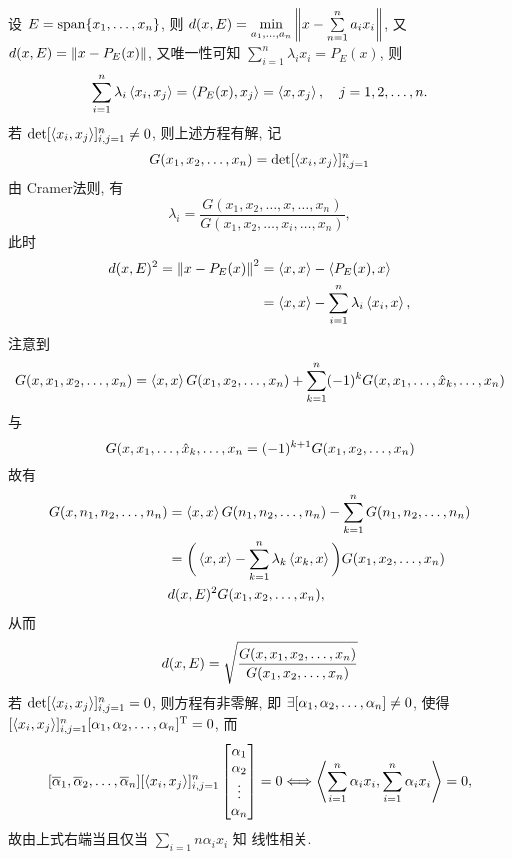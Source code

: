 设 $ E=\operatorname{span}\{ x_{1}, \dots, x_{n} \} $, 则 $ d(x, E)=\min\limits_{a_{1}, \dots, a_{n} }\left\| x-\sum\limits_{n=1}^{n}a_{i}x_{i} \right\| $, 又 $ d(x, E)=\left\| x-P_{E}(x) \right\| $, 又唯一性可知 $ \sum\limits_{i=1}^{n}\lambda_{i}x_{i}=P_{E}(x) $, 则
\[
	\sum_{i=1}^{n}\lambda_{i}\left\langle x_{i}, x_{j} \right\rangle=\left\langle P_{E}(x), x_{j} \right\rangle=\left\langle x, x_{j} \right\rangle, \quad j = 1, 2, \dots, n.
\]
若 $ \det[\left\langle x_{i}, x_{j} \right\rangle]_{i, j=1}^{n}\ne 0 $, 则上述方程有解, 记
\[
	G(x_{1}, x_{2}, \dots, x_{n})=\det[\left\langle x_{i}, x_{j} \right\rangle]_{i, j=1}^{n}
\]
由 Cramer法则, 有
\[
	\lambda_{i}=\frac{G(x_{1}, x_{2}, \dots, x, \dots, x_{n})}{G(x_{1}, x_{2}, \dots, x_{i}, \dots, x_{n})},
\]
此时
\[
	\begin{aligned}
		d(x, E)^{2}=\left\| x-P_{E}(x) \right\|^{2} & =\left\langle x, x \right\rangle-\left\langle P_{E}(x), x \right\rangle                         \\
		                                  & = \left\langle x, x \right\rangle-\sum_{i=1}^{n}\lambda_{i}\left\langle x_{i}, x \right\rangle,
	\end{aligned}
\]
注意到
\[
	G(x, x_{1}, x_{2}, \dots, x_{n})=\left\langle x, x \right\rangle G(x_{1}, x_{2}, \dots, x_{n})+\sum_{k=1}^{n}(-1)^{k}G(x, x_{1}, \dots, \hat{x}_{k}, \dots, x_{n})
\]
与
\[
	G(x, x_{1}, \dots, \hat{x}_{k}, \dots, x_{n}=(-1)^{k+1}G(x_{1}, x_{2}, \dots, x_{n})
\]
故有
\[
	\begin{aligned}
		G(x, n_{1}, n_{2}, \dots, n_{n}) & =\left\langle x, x \right\rangle G(n_{1}, n_{2}, \dots, n_{n})-\sum_{k=1}^{n}G(n_{1}, n_{2}, \dots, n_{n})                                   \\
		              & = \bigg( \left\langle x, x \right\rangle-\sum_{k=1}^{n}\lambda_{k}\left\langle x_{k}, x \right\rangle \bigg)G(x_{1}, x_{2}, \dots, x_{n}) \\
		              & d(x, E)^{2}G(x_{1}, x_{2}, \dots, x_{n}),
	\end{aligned}
\]
从而
\[
	d(x, E)=\sqrt{\frac{G(x, x_{1}, x_{2}, \dots, x_{n})}{G(x_{1}, x_{2}, \dots, x_{n})}}
\]
若 $ \det[\left\langle x_{i}, x_{j} \right\rangle]_{i, j=1}^{n}=0 $, 则方程有非零解, 即 $ \exists[\alpha_{1}, \alpha_{2}, \dots, \alpha_{n}]\ne0 $, 使得 $ [\left\langle x_{i}, x_{j} \right\rangle]_{i, j=1}^{n}[\alpha_{1}, \alpha_{2}, \dots, \alpha_{n}]^{\textrm{T}}=0 $, 而
\[
	[\overline{\alpha}_{1}, \overline{\alpha}_{2}, \dots, \overline{\alpha}_{n}][\left\langle x_{i}, x_{j} \right\rangle]_{i, j=1}^{n}\begin{bmatrix}
		\alpha_{1} \\\alpha_{2}\\\vdots\\\alpha_{n}
	\end{bmatrix}=0\Longleftrightarrow \left\langle \sum_{i=1}^{n}\alpha_{i}x_{i}, \sum_{i=1}^{n}\alpha_{i}x_{i} \right\rangle=0,
\]
故由上式右端当且仅当 $ \sum\limits_{i=1}{n}\alpha_{i}x_{i} $ 知  线性相关.



